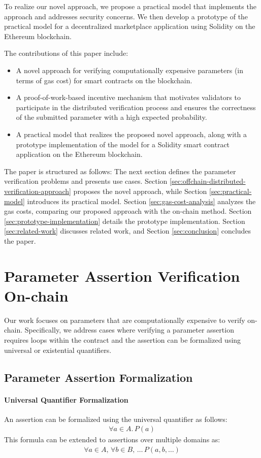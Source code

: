 \documentclass[runningheads]{llncs}
\begin{document}
To realize our novel approach, we propose a practical model that implements the approach and addresses security concerns. We then develop a prototype of the practical model for a decentralized marketplace application using Solidity on the Ethereum blockchain.

The contributions of this paper include:
\begin{itemize}
    \item A novel approach for verifying computationally expensive parameters (in terms of gas cost) for smart contracts on the blockchain.
    \item A proof-of-work-based incentive mechanism that motivates validators to participate in the distributed verification process and ensures the correctness of the submitted parameter with a high expected probability.
    \item A practical model that realizes the proposed novel approach, along with a prototype implementation of the model for a Solidity smart contract application on the Ethereum blockchain.
\end{itemize}


The paper is structured as follows: The next section defines the parameter verification problems and presents use cases. Section \ref{sec:offchain-distributed-verification-approach} proposes the novel approach, while Section \ref{sec:practical-model} introduces its practical model. Section \ref{sec:gas-cost-analysis} analyzes the gas costs, comparing our proposed approach with the on-chain method. Section \ref{sec:prototype-implementation} details the prototype implementation. Section \ref{sec:related-work} discusses related work, and Section \ref{sec:conclusion} concludes the paper.
\section{Parameter Assertion Verification On-chain}
\label{sec:parameter-assertion-verification-onchain}
Our work focuses on parameters that are computationally expensive to verify on-chain. Specifically, we address cases where verifying a parameter assertion requires loops within the contract and the assertion can be formalized using universal or existential quantifiers.
\subsection{Parameter Assertion Formalization}
\paragraph{Universal Quantifier Formalization}
An assertion can be formalized using the universal quantifier as follows:
\begin{gather}
  \label{eq:1}
  \forall a \in A. \, P(a)
\end{gather}
This formula can be extended to assertions over multiple domains as:
\begin{gather}
  \label{eq:2}
  \forall a \in A, \, \forall b \in B, \, \dots \, P(a, b, \dots)
\end{gather}
\end{document}

